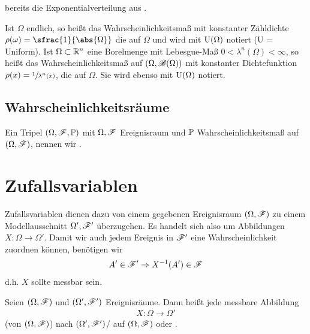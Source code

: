 bereits die Exponentialverteilung aus .
\begin{definition}[Gleichverteilung]
	Ist $\Omega$ endlich, so heißt das Wahrscheinlichkeitsmaß mit konstanter Zähldichte $\rho(\omega) = \sfrac{1}{\abs{\Omega}}$ die  auf $\Omega$ und wird mit $\operatorname{U}(\Omega)$ notiert (U = Uniform).
	Ist $\Omega \subset \mathbb{R}^n$ eine Borelmenge mit Lebesgue-Maß $0 < \lambda^n(\Omega) < \infty$, so heißt das Wahrscheinlichkeitsmaß auf $(\Omega, \mathscr{B}(\Omega))$ mit konstanter Dichtefunktion $\rho(x) = \sfrac{1}{\lambda^n(x)}$, die  auf $\Omega$. 
	Sie wird ebenso mit $\operatorname{U}(\Omega)$ notiert.
\end{definition}

\subsection*{Wahrscheinlichkeitsräume}

\begin{definition}[Wahrscheinlichkeitsraum]
	Ein Tripel $(\Omega, \mathscr F, \mathbb{P})$ mit $\Omega, \mathscr F$ Ereignisraum und $\mathbb{P}$ Wahrscheinlichkeitsmaß auf $(\Omega, \mathscr F)$, nennen wir .
\end{definition}

\section{Zufallsvariablen}

Zufallsvariablen dienen dazu von einem gegebenen Ereignisraum $(\Omega, \mathscr{F})$ zu einem Modellausschnitt $\Omega', \mathscr{F}'$ überzugehen. 
Es handelt sich also um Abbildungen $X: \Omega \to \Omega'$.
Damit wir auch jedem Ereignis in $\mathscr{F}'$ eine Wahrscheinlichkeit zuordnen können, benötigen wir	
\begin{align*}
	A' \in \mathscr{F}' \Rightarrow X^{-1}(A') \in \mathscr F		
\end{align*}
d.h. $X$ sollte messbar sein.

\begin{definition}[Zufallsvariable]
	Seien $(\Omega, \mathscr F)$ und $(\Omega', \mathscr F')$ Ereignisräume. Dann heißt jede messbare Abbildung
	\begin{align*}
		X: \Omega \to \Omega'
	\end{align*}
	 (von $(\Omega, \mathscr F)$) nach $(\Omega', \mathscr F')$/ auf $(\Omega, \mathscr F)$ oder .
\end{definition}

